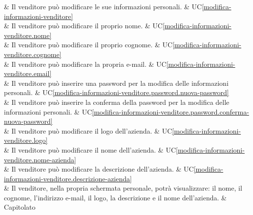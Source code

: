  & Il venditore può modificare le sue informazioni personali. & UC\ref{modifica-informazioni-venditore} \\
	
 & Il venditore può modificare il proprio nome. & UC\ref{modifica-informazioni-venditore.nome} \\
	
 & Il venditore può modificare il proprio cognome. & UC\ref{modifica-informazioni-venditore.cognome} \\
	
 & Il venditore può modificare la propria e-mail. & UC\ref{modifica-informazioni-venditore.email} \\
	
 & Il venditore può inserire una password per la modifica delle informazioni personali. & UC\ref{modifica-informazioni-venditore.password.nuova-password} \\
	
 & Il venditore può inserire la conferma della password per la modifica delle informazioni personali. & UC\ref{modifica-informazioni-venditore.password.conferma-nuova-password} \\
	
 & Il venditore può modificare il logo dell'azienda. & UC\ref{modifica-informazioni-venditore.logo} \\
	
 & Il venditore può modificare il nome dell'azienda. & UC\ref{modifica-informazioni-venditore.nome-azienda} \\
	
 & Il venditore può modificare la descrizione dell'azienda. & UC\ref{modifica-informazioni-venditore.descrizione-azienda} \\
	
 & Il venditore, nella propria schermata personale, potrà visualizzare: il nome, il cognome, l'indirizzo e-mail, il logo, la descrizione e il nome dell'azienda. & Capitolato \\ 